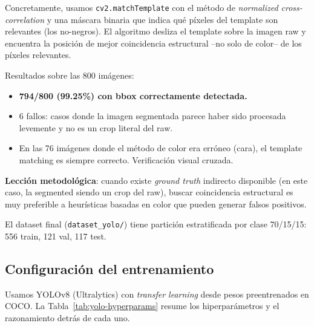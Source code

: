 \documentclass[a4paper,11pt]{article}
\begin{document}
Concretamente, usamos \texttt{cv2.matchTemplate} con el método de \textit{normalized cross-correlation} y una máscara binaria que indica qué píxeles del template son relevantes (los no-negros). El algoritmo desliza el template sobre la imagen raw y encuentra la posición de mejor coincidencia estructural --no solo de color-- de los píxeles relevantes.

Resultados sobre las 800 imágenes:
\begin{itemize}[itemsep=2pt]
    \item \textbf{794/800 (99.25\%) con bbox correctamente detectada.}
    \item 6 fallos: casos donde la imagen segmentada parece haber sido procesada levemente y no es un crop literal del raw.
    \item En las 76 imágenes donde el método de color era erróneo (cara), el template matching es siempre correcto. Verificación visual cruzada.
\end{itemize}

\textbf{Lección metodológica}: cuando existe \textit{ground truth} indirecto disponible (en este caso, la segmented siendo un crop del raw), buscar coincidencia estructural es muy preferible a heurísticas basadas en color que pueden generar falsos positivos.

El dataset final (\texttt{dataset\_yolo/}) tiene partición estratificada por clase 70/15/15: 556 train, 121 val, 117 test.

\subsection{Configuración del entrenamiento}

Usamos YOLOv8 (Ultralytics) con \textit{transfer learning} desde pesos preentrenados en COCO. La Tabla~\ref{tab:yolo-hyperparams} resume los hiperparámetros y el razonamiento detrás de cada uno.
\end{document}
